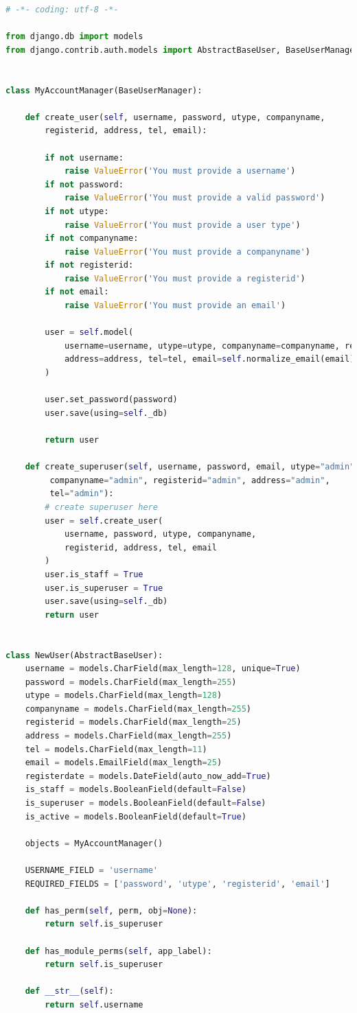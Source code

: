 \documentclass[12pt]{article}
\begin{document}
\begin{lstlisting}[language=Python]
# -*- coding: utf-8 -*-

from django.db import models
from django.contrib.auth.models import AbstractBaseUser, BaseUserManager


class MyAccountManager(BaseUserManager):

	def create_user(self, username, password, utype, companyname, 
		registerid, address, tel, email):

		if not username:
			raise ValueError('You must provide a username')
		if not password:
			raise ValueError('You must provide a valid password')
		if not utype:
			raise ValueError('You must provide a user type')
		if not companyname:
			raise ValueError('You must provide a companyname')
		if not registerid:
			raise ValueError('You must provide a registerid')
		if not email:
			raise ValueError('You must provide an email')

		user = self.model(
			username=username, utype=utype, companyname=companyname, registerid=registerid, 
			address=address, tel=tel, email=self.normalize_email(email)
		)

		user.set_password(password)
		user.save(using=self._db)

		return user

	def create_superuser(self, username, password, email, utype="admin",
		 companyname="admin", registerid="admin", address="admin", 
		 tel="admin"):
		# create superuser here
		user = self.create_user(
			username, password, utype, companyname, 
			registerid, address, tel, email
		)
		user.is_staff = True
		user.is_superuser = True
		user.save(using=self._db)
		return user


class NewUser(AbstractBaseUser):
	username = models.CharField(max_length=128, unique=True)
	password = models.CharField(max_length=255)
	utype = models.CharField(max_length=128)
	companyname = models.CharField(max_length=255)
	registerid = models.CharField(max_length=25)
	address = models.CharField(max_length=255)
	tel = models.CharField(max_length=11)
	email = models.EmailField(max_length=25)
	registerdate = models.DateField(auto_now_add=True)
	is_staff = models.BooleanField(default=False)
	is_superuser = models.BooleanField(default=False)
	is_active = models.BooleanField(default=True)

	objects = MyAccountManager()

	USERNAME_FIELD = 'username'
	REQUIRED_FIELDS = ['password', 'utype', 'registerid', 'email']

	def has_perm(self, perm, obj=None):
		return self.is_superuser

	def has_module_perms(self, app_label):
		return self.is_superuser

	def __str__(self):
		return self.username
\end{lstlisting}
\end{document}
